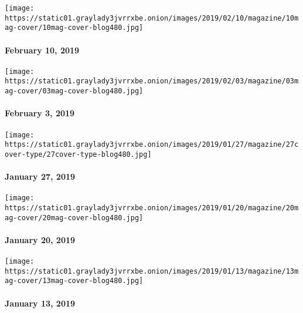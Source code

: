 \href{https://www.nytimes3xbfgragh.onion/issue/magazine/2019/02/08/the-021019-issue}{}

\texttt{[image: https://static01.graylady3jvrrxbe.onion/images/2019/02/10/magazine/10mag-cover/10mag-cover-blog480.jpg]}

\hypertarget{february-10-2019}{%
\paragraph{February 10, 2019}\label{february-10-2019}}

\href{https://www.nytimes3xbfgragh.onion/issue/magazine/2019/02/08/the-020319-issue}{}

\texttt{[image: https://static01.graylady3jvrrxbe.onion/images/2019/02/03/magazine/03mag-cover/03mag-cover-blog480.jpg]}

\hypertarget{february-3-2019}{%
\paragraph{February 3, 2019}\label{february-3-2019}}

\href{https://www.nytimes3xbfgragh.onion/issue/magazine/2019/01/28/the-12719-issue}{}

\texttt{[image: https://static01.graylady3jvrrxbe.onion/images/2019/01/27/magazine/27cover-type/27cover-type-blog480.jpg]}

\hypertarget{january-27-2019}{%
\paragraph{January 27, 2019}\label{january-27-2019}}

\href{https://www.nytimes3xbfgragh.onion/issue/magazine/2019/01/18/the-12019-issue}{}

\texttt{[image: https://static01.graylady3jvrrxbe.onion/images/2019/01/20/magazine/20mag-cover/20mag-cover-blog480.jpg]}

\hypertarget{january-20-2019}{%
\paragraph{January 20, 2019}\label{january-20-2019}}

\href{https://www.nytimes3xbfgragh.onion/issue/magazine/2019/01/11/the-11318-issue}{}

\texttt{[image: https://static01.graylady3jvrrxbe.onion/images/2019/01/13/magazine/13mag-cover/13mag-cover-blog480.jpg]}

\hypertarget{january-13-2019}{%
\paragraph{January 13, 2019}\label{january-13-2019}}

